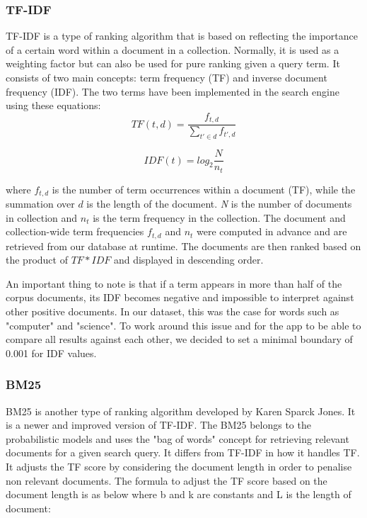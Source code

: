 \subsubsection{TF-IDF} %
\label{sub:tf_idf}

TF-IDF is a type of ranking algorithm that is based on reflecting the importance of a certain word within a document in a collection. Normally, it is used as a weighting factor but can also be used for pure ranking given a query term. It consists of two main concepts:  term frequency (TF) and inverse document frequency (IDF). The two terms have been implemented in the search engine using these equations:
$$TF(t,d) = \frac{f_{t,d}}{\sum\limits_{t' \in d} f_{t',d}}$$

$$IDF(t) = log_2 \frac{N}{n_t}$$

where $f_{t,d}$ is the number of term occurrences within a document (TF), while the summation over $d$ is the length of the document. \emph{N} is the number of documents in collection and $n_t$ is the term frequency in the collection. The document and collection-wide term frequencies $f_{t,d}$ and $n_t$ were computed in advance and are retrieved from our database at runtime. The documents are then ranked based on the product of $TF * IDF$ and displayed in descending order.

An important thing to note is that if a term appears in more than half of the corpus documents, its IDF becomes negative and impossible to interpret against other positive documents. In our dataset, this was the case for words such as "computer" and "science". To work around this issue and for the app to be able to compare all results against each other, we decided to set a minimal boundary of 0.001 for IDF values.


\subsubsection{BM25} %
\label{ssub:BM25}

BM25 is another type of ranking algorithm developed by Karen Sparck Jones. It is a newer and improved version of TF-IDF. The BM25 belongs to the probabilistic models and uses the "bag of words" concept for retrieving relevant documents for a given search query. It differs from TF-IDF in how it handles TF. It adjusts the TF score by considering the document length in order to penalise non relevant documents. The formula to adjust the TF score based on the document length is as below where b and k are constants and L is the length of document:

